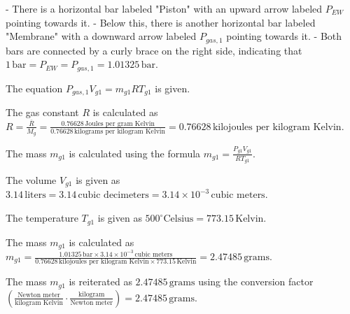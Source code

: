 - There is a horizontal bar labeled "Piston" with an upward arrow labeled \( P_{EW} \) pointing towards it.
- Below this, there is another horizontal bar labeled "Membrane" with a downward arrow labeled \( P_{gas,1} \) pointing towards it.
- Both bars are connected by a curly brace on the right side, indicating that \( 1 \, \text{bar} = P_{EW} = P_{gas,1} = 1.01325 \, \text{bar} \).

The equation \( P_{gas,1} V_{g1} = m_{g1} R T_{g1} \) is given.

The gas constant \( R \) is calculated as \( R = \frac{\overline{R}}{M_g} = \frac{0.76628 \, \text{Joules per gram Kelvin}}{0.76628 \, \text{kilograms per kilogram Kelvin}} = 0.76628 \, \text{kilojoules per kilogram Kelvin} \).

The mass \( m_{g1} \) is calculated using the formula \( m_{g1} = \frac{P_{g1} V_{g1}}{R T_{g1}} \).

The volume \( V_{g1} \) is given as \( 3.14 \, \text{liters} = 3.14 \, \text{cubic decimeters} = 3.14 \times 10^{-3} \, \text{cubic meters} \).

The temperature \( T_{g1} \) is given as \( 500^\circ \text{Celsius} = 773.15 \, \text{Kelvin} \).

The mass \( m_{g1} \) is calculated as \( m_{g1} = \frac{1.01325 \, \text{bar} \times 3.14 \times 10^{-3} \, \text{cubic meters}}{0.76628 \, \text{kilojoules per kilogram Kelvin} \times 773.15 \, \text{Kelvin}} = 2.47485 \, \text{grams} \).

The mass \( m_{g1} \) is reiterated as \( 2.47485 \, \text{grams} \) using the conversion factor \( \left( \frac{\text{Newton meter}}{\text{kilogram Kelvin}} \cdot \frac{\text{kilogram}}{\text{Newton meter}} \right) = 2.47485 \, \text{grams} \).